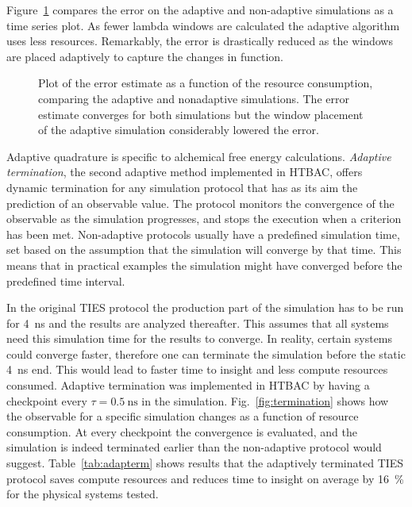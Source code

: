 Figure~\ref{fig:adapconv} compares the error on the adaptive and non-adaptive
simulations as a time series plot. As fewer lambda windows are calculated the
adaptive algorithm uses less resources. Remarkably, the error is drastically
reduced as the windows are placed adaptively to capture the changes in
function.

\begin{figure}
  
  \caption{Plot of the error estimate as a function of the resource
  consumption, comparing the adaptive and nonadaptive simulations. The error
  estimate converges for both simulations but the window placement of the
  adaptive simulation considerably lowered the error.}\label{fig:adapconv}
\up{}
\up{}
\end{figure}


Adaptive quadrature is specific to alchemical free energy calculations.
\emph{Adaptive termination}, the second adaptive method implemented in HTBAC,
offers dynamic termination for any simulation protocol that has as its aim
the prediction of an observable value. The protocol monitors the convergence
of the observable as the simulation progresses, and stops the execution when
a criterion has been met. Non-adaptive protocols usually have a predefined
simulation time, set based on the assumption that the simulation will
converge by that time. This means that in practical examples the simulation
might have converged before the predefined time interval.

In the original TIES protocol the production part of the simulation has to be
run for \SI{4}{\nano\second} and the results are analyzed thereafter. This
assumes that all systems need this simulation time for the results to
converge. In reality, certain systems could converge faster, therefore one
can terminate the simulation before the static \SI{4}{\nano\second} end. This
would lead to faster time to insight and less compute resources consumed.
Adaptive termination was implemented in HTBAC by having a checkpoint every
$\tau = \SI{0.5}{\nano\second}$ in the simulation. Fig.~\ref{fig:termination}
shows how the observable for a specific simulation changes as a function of
resource consumption. At every checkpoint the convergence is evaluated, and
the simulation is indeed terminated earlier than the non-adaptive protocol
would suggest. Table~\ref{tab:adapterm} shows results that the adaptively
terminated TIES protocol saves compute resources and reduces time to insight
on average by \SI{16}{\percent} for the physical systems tested.

